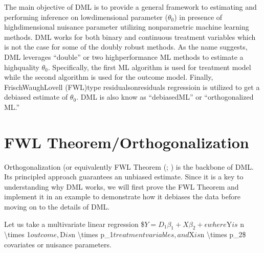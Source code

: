\documentclass[letterpaper,10pt,english]{jupyterBook}
\begin{document}
\sphinxAtStartPar
The main objective of DML is to provide a general framework to estimating and performing inference on low\sphinxhyphen{}dimensional parameter (\( \theta_0\)) in presence of high\sphinxhyphen{}dimensional nuisance parameter utilizing nonparametric machine learning methods. DML works for both binary and continuous treatment variables which is not the case for some of the doubly robust methods. As the name suggests, DML leverages “double” or two high\sphinxhyphen{}performance ML methods to estimate a high\sphinxhyphen{}quality \(\theta_0\). Specifically, the first ML algorithm is used for treatment model while the second algorithm is used for the outcome model. Finally, Frisch\sphinxhyphen{}Waugh\sphinxhyphen{}Lovell (FWL)\sphinxhyphen{}type residuals\sphinxhyphen{}on\sphinxhyphen{}residuals regressioin is utilized to get a de\sphinxhyphen{}biased estimate of \(\theta_0\). DML is also know as “debiased\sphinxhyphen{}ML” or “orthogonalized ML.”


\section{FWL Theorem/Orthogonalization}
\label{\detokenize{orthogonal_DML:fwl-theorem-orthogonalization}}
\sphinxAtStartPar
Orthogonalization (or equivalently FWL Theorem (; ) is the backbone of DML. Its principled approach guarantees an unbiased estimate. Since it is a key to understanding why DML works, we will first prove the FWL Theorem and implement it in an example to demonstrate how it debiases the data before moving on to the details of DML.

\sphinxAtStartPar
Let us take a multivariate linear regression
\$\( Y = D_1\beta_1 + X\beta_2 + \epsilon \)\(
where \)Y\( is \) n \textbackslash{}times 1\( outcome, \)D\( is \)n \textbackslash{}times p\_1\( treatment variables, and \)X\( is \)n \textbackslash{}times p\_2\$ covariates or nuisance parameters.
\end{document}
